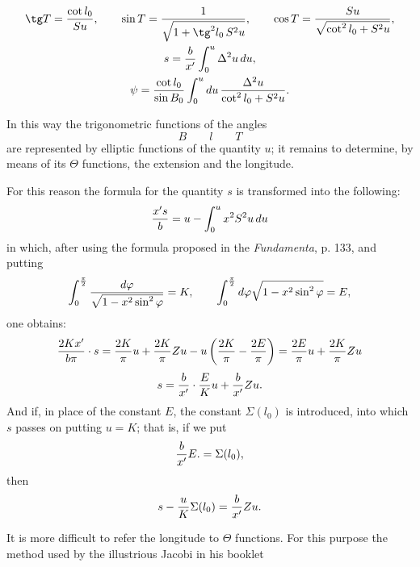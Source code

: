 \begingroup\small
\[
\begin{gathered}
 \tg T={\cot l_0\over Su},\qquad
 \sin T={1\over \sqrt{1+\tg^2l_0\,S^2u}},\qquad
 \cos T={Su\over \sqrt{\cot^2l_0+S^2u}},\\
 s={b\over x'}\int_0^u \Delta^2u\,du,\\
 \psi={\cot l_0\over \sin B_0}\int_0^u du\,{\Delta^2u\over \cot^2l_0+S^2u}.
\end{gathered}
\]


In this way the trigonometric functions of the angles
\[
 B\qquad l\qquad T
\]
are represented by elliptic functions of the quantity $u$; it remains to determine, by means of its $\Theta$ functions, the extension and the longitude.

For this reason the formula for the quantity $s$ is transformed into the following:
\[
 {x's\over b}=u-\int_0^u x^2S^2u\,du
\]
in which, after using the formula proposed in the \emph{Fundamenta}, p. 133, and putting
\[
 \int_0^{\frac{\pi}{2}}{d\varphi\over \sqrt{1-x^2\sin^2\varphi}}=K,
 \qquad
 \int_0^{\frac{\pi}{2}}d\varphi\sqrt{1-x^2\sin^2\varphi}=E,
\]
one obtains:
\[
 {2Kx'\over b\pi}\cdot s={2K\over\pi}u+{2K\over\pi}Zu-u\left({2K\over\pi}-{2E\over\pi}\right)
 ={2E\over\pi}u+{2K\over\pi}Zu
\]
\[
 s={b\over x'}\cdot {E\over K}u+{b\over x'}Zu.
\]
And if, in place of the constant $E$, the constant $\Sigma(l_0)$ is introduced, into which $s$ passes on putting $u=K$; that is, if we put
\[
 {b\over x'}E. = \Sigma(l_0),
\]
then
\[
 s-{u\over K}\Sigma(l_0)={b\over x'}Zu.
\]


It is more difficult to refer the longitude to $\Theta$ functions. For this purpose the method used by the illustrious Jacobi in his booklet
\endgroup
